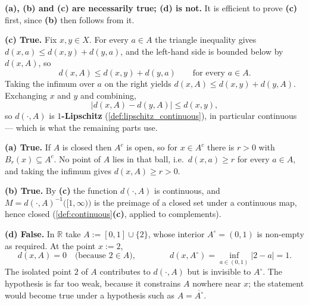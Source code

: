 \begin{exercisesolution}
\textbf{(a), (b) and (c) are necessarily true; (d) is not.} It is efficient to prove
\textbf{(c)} first, since \textbf{(b)} then follows from it.

\textbf{(c) True.} Fix $x,y \in X$. For every $a \in A$ the triangle inequality gives
$d(x,a) \leq d(x,y) + d(y,a)$, and the left-hand side is bounded below by $d(x,A)$, so
\[d(x,A) \leq d(x,y) + d(y,a) \qquad\text{for every } a \in A.\]
Taking the infimum over $a$ on the right yields $d(x,A) \leq d(x,y) + d(y,A)$. Exchanging $x$
and $y$ and combining,
\[\big|d(x,A) - d(y,A)\big| \leq d(x,y),\]
so $d(\cdot,A)$ is \textbf{$1$-Lipschitz} (\cref{def:lipschitz_continuous}), in particular
continuous --- which is what the remaining parts use.

\textbf{(a) True.} If $A$ is closed then $A^c$ is open, so for $x \in A^c$ there is $r>0$ with
$B_r(x) \subseteq A^c$. No point of $A$ lies in that ball, i.e.\ $d(x,a) \geq r$ for every
$a \in A$, and taking the infimum gives $d(x,A) \geq r > 0$.

\textbf{(b) True.} By \textbf{(c)} the function $d(\cdot,A)$ is continuous, and
$M = d(\cdot,A)^{-1}\big([1,\infty)\big)$ is the preimage of a closed set under a continuous
map, hence closed (\cref{def:continuous}\textbf{(c)}, applied to complements).

\textbf{(d) False.} In $\mathbb{R}$ take $A := [0,1]\cup\{2\}$, whose interior
$A^\circ = (0,1)$ is non-empty as required. At the point $x := 2$,
\[d(x,A) = 0 \quad\text{(because } 2 \in A\text{)}, \qquad\qquad
  d(x,A^\circ) = \inf_{a\in(0,1)}|2-a| = 1.\]
The isolated point $2$ of $A$ contributes to $d(\cdot,A)$ but is invisible to $A^\circ$. The
hypothesis  is far too weak, because it constrains $A$ nowhere near
$x$; the statement would become true under a hypothesis such as $A = \overline{A^\circ}$.
\end{exercisesolution}

